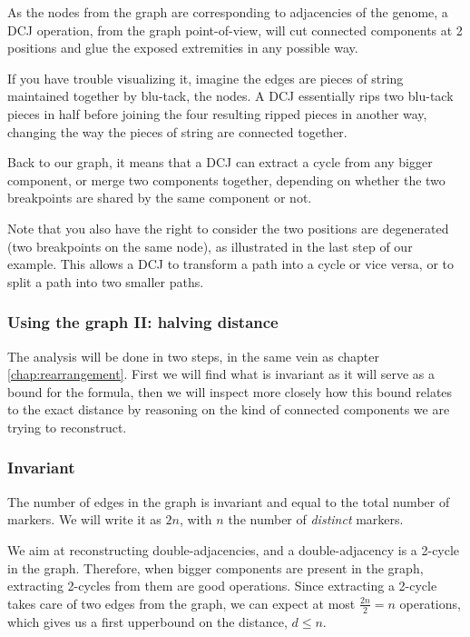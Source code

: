 \documentclass[11pt,final,twoside,nofrench]{thlifl}
\begin{document}
\clearpage

As the nodes from the graph are corresponding to adjacencies of the genome, a DCJ operation, from the graph point-of-view, will cut connected components at 2 positions and glue the exposed extremities in any possible way.

If you have trouble visualizing it, imagine the edges are pieces of string maintained together by blu-tack, the nodes. A DCJ essentially rips two blu-tack pieces in half before joining the four resulting ripped pieces in another way, changing the way the pieces of string are connected together.

Back to our graph, it means that a DCJ can extract a cycle from any bigger component, or merge two components together, depending on whether the two breakpoints are shared by the same component or not.

Note that you also have the right to consider the two positions are degenerated (two breakpoints on the same node), as illustrated in the last step of our example. This allows a DCJ to transform a path into a cycle or vice versa, or to split a path into two smaller paths.

\subsubsection{Using the graph II: halving distance}

The analysis will be done in two steps, in the same vein as chapter \ref{chap:rearrangement}. First we will find what is invariant as it will serve as a bound for the formula, then we will inspect more closely how this bound relates to the exact distance by reasoning on the kind of connected components we are trying to reconstruct.

\subsubsection*{Invariant}

The number of edges in the graph is invariant and equal to the total number of markers. We will write it as $2n$, with $n$ the number of \emph{distinct} markers. 

We aim at reconstructing double-adjacencies, and a double-adjacency is a 2-cycle in the graph. Therefore, when bigger components are present in the graph, extracting 2-cycles from them are good operations. Since extracting a 2-cycle takes care of two edges from the graph, we can expect at most $\frac{2n}{2}=n$ operations, which gives us a first upperbound on the distance, $d \leq n$.
\end{document}
